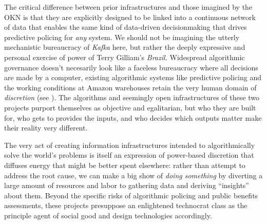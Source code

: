 The critical difference between prior infrastructures and those imagined
by the OKN is that they are explicitly designed to be linked into a
continuous network of data that enables the same kind of data-driven
decisionmaking that drives predictive policing for \emph{any} system. We
should not be imagining the utterly mechanistic bureaucracy of
\emph{Kafka} here, but rather the deeply expressive and personal
exercise of power of Terry Gilliam's \emph{Brazil.} Widespread
algorithmic governance doesn't necesarily look like a faceless
bureaucracy where all decisions are made by a computer, existing
algorithmic systems like predictive policing and the working conditions
at Amazon warehouses retain the very human domain of \emph{discretion}
(see \cite{hongPredictionExtractionDiscretion2022} ). The
algorithms and seemingly open infrastructures of these two projects
purport themselves as objective and egalitarian, but who they are built
for, who gets to provides the inputs, and who decides which outputs
matter make their reality very different.

The very act of creating information infrastructures intended to
algorithmically solve the world's problems is itself an expression of
power-based discretion that diffuses energy that might be better spent
elsewhere: rather than attempt to address the root cause, we can make a
big show of \emph{doing something} by diverting a large amount of
resources and labor to gathering data and deriving ``insights'' about
them. Beyond the specific risks of algorithmic policing and public
benefits assessments, these projects presuppose an enlightened
technocrat class as the principle agent of social good and design
technologies accordingly.

